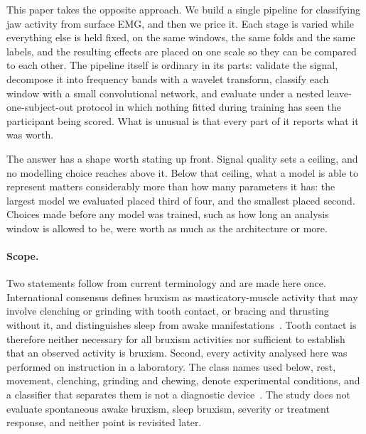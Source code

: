\documentclass[pdflatex,sn-nature,iicol]{sn-jnl}
\begin{document}
This paper takes the opposite approach. We build a single pipeline for classifying jaw activity from surface EMG, and then we price it. Each stage is varied while everything else is held fixed, on the same windows, the same folds and the same labels, and the resulting effects are placed on one scale so they can be compared to each other. The pipeline itself is ordinary in its parts: validate the signal, decompose it into frequency bands with a wavelet transform, classify each window with a small convolutional network, and evaluate under a nested leave-one-subject-out protocol in which nothing fitted during training has seen the participant being scored. What is unusual is that every part of it reports what it was worth.

The answer has a shape worth stating up front. Signal quality sets a ceiling, and no modelling choice reaches above it. Below that ceiling, what a model is able to represent matters considerably more than how many parameters it has: the largest model we evaluated placed third of four, and the smallest placed second. Choices made before any model was trained, such as how long an analysis window is allowed to be, were worth as much as the architecture or more.

\paragraph{Scope.} Two statements follow from current terminology and are made here once. International consensus defines bruxism as masticatory-muscle activity that may involve clenching or grinding with tooth contact, or bracing and thrusting without it, and distinguishes sleep from awake manifestations~\cite{lobbezoo2013bruxism,lobbezoo2018international,verhoeff2025definitions,manfredini2022bruxism}. Tooth contact is therefore neither necessary for all bruxism activities nor sufficient to establish that an observed activity is bruxism. Second, every activity analysed here was performed on instruction in a laboratory. The class names used below, rest, movement, clenching, grinding and chewing, denote experimental conditions, and a classifier that separates them is not a diagnostic device~\cite{manfredini2024standardised}. The study does not evaluate spontaneous awake bruxism, sleep bruxism, severity or treatment response, and neither point is revisited later.
\end{document}

